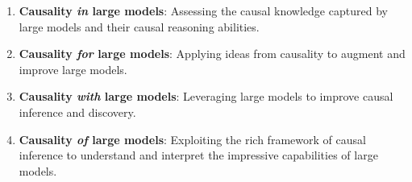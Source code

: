 \documentclass{article}
\begin{document}

\begin{enumerate}[nolistsep]
    \item \textbf{Causality \textit{in} large models}: Assessing the causal knowledge captured by large models and their causal reasoning abilities. 
    \item \textbf{Causality \textit{for} large models}: Applying ideas from causality to augment and improve large models.
    \item \textbf{Causality \textit{with} large models}: Leveraging large models to improve causal inference and discovery.
    \item \textbf{Causality \textit{of} large models}: Exploiting the rich framework of causal inference %
    to understand and interpret the impressive capabilities of large models. 

\end{enumerate}
\end{document}
